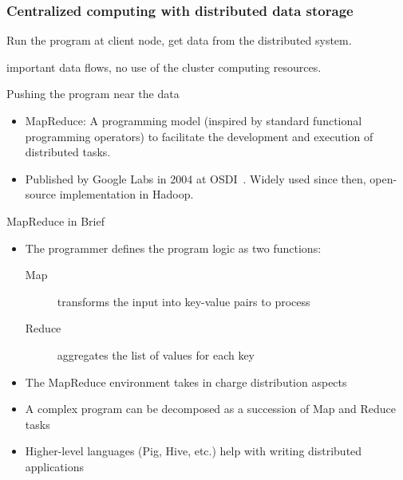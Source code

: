 \begin{frame}
\frametitle{Centralized computing with distributed data storage} 

Run the program at client node, get data from the distributed system.


important data flows, no use of the cluster computing resources.

\end{frame}

\begin{frame}{Pushing the program near the data}


\begin{itemize}

\item \alert{MapReduce}: 
A \alert{programming model} (inspired by standard functional programming operators)
to facilitate the development and execution of distributed tasks.

\item 
Published by Google Labs in 2004 at OSDI~\cite{DG04}. Widely used since
then, open-source implementation in \alert{Hadoop}.

\end{itemize}

\end{frame}

\begin{frame}{MapReduce in Brief}
\begin{itemize}

\item The programmer defines the program logic as \alert{two functions}:

\begin{description}
\item[Map] transforms the input into key-value pairs to process
\item[Reduce] aggregates the list of values for each key
\end{description}

\item The MapReduce environment takes in charge \alert{distribution
aspects}

\item A complex program can be decomposed as a \alert{succession}
 of Map and Reduce
tasks

\item Higher-level languages (\alert{Pig}, Hive, etc.) help with writing
distributed applications
\end{itemize}

\end{frame}

